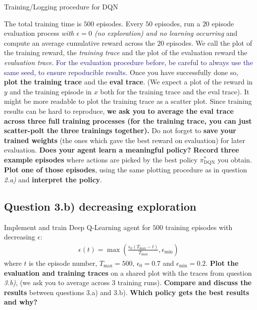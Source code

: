 \documentclass[10pt]{article}
\begin{document}
\begin{algorithm}[H]
  \SetAlgoLined
  \caption{Training/Logging procedure for DQN}
\end{algorithm}

\noindent
The total training time is $500$ episodes. Every $50$ episodes, run a $20$ episode evaluation process \textit{with $\epsilon=0$  (no exploration) and no learning occurring} and compute an average cumulative reward across the $20$ episodes.
We call the plot of the training reward, the \textit{training trace} and the plot of the evaluation reward the \textit{evaluation trace}.
\textcolor{MidnightBlue}{For the evaluation procedure before, be careful to always use the same seed, to ensure repoducible results.} Once you have successfully done so, \textbf{plot the training trace} and the \textbf{eval trace}.
(We expect a plot of the reward in $y$ and the training episode in $x$ both for the training trace and the eval trace).
It might be more readable to plot the training trace as a scatter plot.
Since training results can be hard to reproduce, \textbf{we ask you to average the eval trace across three full training processes (for the training trace, you can just scatter-polt the three trainings together).}
Do not forget to \textbf{save your trained weights} (the ones which gave the best reward on evaluation) for later evaluation.
\textbf{Does your agent learn a meaningful policy?}
\textbf{Record three example episodes} where actions are picked by the best policy $\pi^*_\text{DQN}$ you obtain.
\textbf{Plot one of those episodes}, using the same plotting procedure as in question \textit{2.a)} and \textbf{interpret the policy}.

\subsection*{Question 3.b) decreasing exploration}
Implement and train Deep Q-Learning agent for $500$ training episodes with decreasing $\epsilon$:
\begin{align}
  \epsilon(t)= \max\left(\frac{\epsilon_0(T_\text{max} - t)}{T_\text{max}}, \epsilon_\text{min}\right)
\end{align}
where $t$ is the episode number, $T_\text{max}=500$, $\epsilon_0 = 0.7$ and $\epsilon_\text{min} = 0.2$. \textbf{Plot the evaluation and training traces} on a shared plot with the traces from question \textit{3.b)}, (we ask you to average across $3$ training runs). \textbf{Compare and discuss the results} between questions 3.a) and 3.b). \textbf{Which policy gets the best results and why?}
\end{document}
